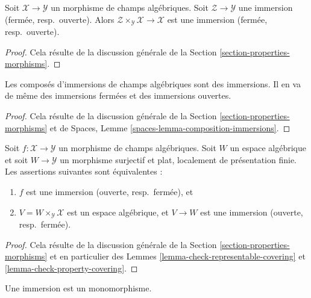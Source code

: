 \begin{lemma}
\label{lemma-base-change-immersion}
Soit $\mathcal{X} \to \mathcal{Y}$ un morphisme de champs algébriques.
Soit $\mathcal{Z} \to \mathcal{Y}$ une immersion
(fermée, resp.\ ouverte).
Alors $\mathcal{Z} \times_\mathcal{Y} \mathcal{X} \to \mathcal{X}$
est une immersion (fermée, resp.\ ouverte).
\end{lemma}

\begin{proof}
Cela résulte de la discussion générale de la
Section \ref{section-properties-morphisms}.
\end{proof}

\begin{lemma}
\label{lemma-composition-immersion}
Les composés d'immersions de champs algébriques sont des immersions.
Il en va de même des immersions fermées et des immersions ouvertes.
\end{lemma}

\begin{proof}
Cela résulte de la discussion générale de la
Section \ref{section-properties-morphisms}
et de
Spaces, Lemme \ref{spaces-lemma-composition-immersions}.
\end{proof}

\begin{lemma}
\label{lemma-check-immersion-covering}
Soit $f : \mathcal{X} \to \mathcal{Y}$ un morphisme de champs algébriques.
Soit $W$ un espace algébrique et soit $W \to \mathcal{Y}$ un morphisme surjectif
et plat, localement de présentation finie. Les assertions suivantes
sont équivalentes :
\begin{enumerate}
\item $f$ est une immersion (ouverte, resp.\ fermée), et
\item $V = W \times_\mathcal{Y} \mathcal{X}$ est un espace algébrique, et
$V \to W$ est une immersion (ouverte, resp.\ fermée).
\end{enumerate}
\end{lemma}

\begin{proof}
Cela résulte de la discussion générale de la
Section \ref{section-properties-morphisms}
et en particulier des
Lemmes \ref{lemma-check-representable-covering} et
\ref{lemma-check-property-covering}.
\end{proof}

\begin{lemma}
\label{lemma-immersion-monomorphism}
Une immersion est un monomorphisme.
\end{lemma}

